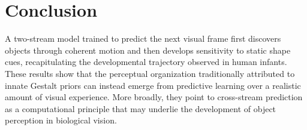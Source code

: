 \documentclass{ccn}  %
\newcommand{\TS}[1]{\textcolor{magenta}{[TS: #1]}}
\begin{document}

\section{Conclusion}

A two-stream model trained to predict the next visual frame first discovers objects through coherent motion and then develops sensitivity to static shape cues, recapitulating the developmental trajectory observed in human infants. These results show that the perceptual organization traditionally attributed to innate Gestalt priors can instead emerge from predictive learning over a realistic amount of visual experience. More broadly, they point to cross-stream prediction as a computational principle that may underlie the development of object perception in biological vision. 







\printbibliography
\end{document}
